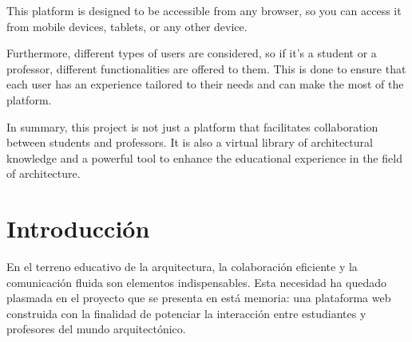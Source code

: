 \documentclass[a4paper, 12pt]{book}
\begin{document}
This platform is designed to be accessible from any browser, so you can access it from mobile devices, tablets, or any other device.

Furthermore, different types of users are considered, so if it's a student or a professor, different functionalities are 
offered to them. This is done to ensure that each user has an experience tailored to their needs and can make the most of 
the platform.

In summary, this project is not just a platform that facilitates collaboration between students and professors. It is also a 
virtual library of architectural knowledge and a powerful tool to enhance the educational experience in the field of architecture.



\tableofcontents 
\cleardoublepage
\listoffigures %



\cleardoublepage
\chapter{Introducción}
\label{sec:intro} %

En el terreno educativo de la arquitectura, la colaboración eficiente y la comunicación fluida son elementos 
indispensables. Esta necesidad ha quedado plasmada en el proyecto que se presenta en está memoria: una plataforma web construida con la finalidad 
de potenciar la interacción entre estudiantes y profesores del mundo arquitectónico.
\end{document}
